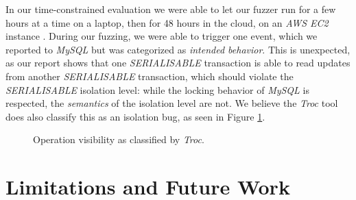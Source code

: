In our time-constrained evaluation we were able to let our fuzzer run for a few hours at a time on a laptop, then for 48 hours in the cloud, on an \textit{AWS EC2} instance \cite{awswebpage}. During our fuzzing, we were able to trigger one event, which we reported to \textit{MySQL} but was categorized as \textit{intended behavior}. This is unexpected, as our report shows that one \textit{SERIALISABLE} transaction is able to read updates from another \textit{SERIALISABLE} transaction, which should violate the \textit{SERIALISABLE} isolation level: while the locking behavior of \textit{MySQL} is respected, the \textit{semantics} of the isolation level are not. We believe the \textit{Troc} tool \cite{dou2023detecting_ICSE2023} does also classify this as an isolation bug, as seen in Figure \ref{fig:trocclassification}.


\begin{figure}[!h]
    \centering
    \caption{Operation visibility as classified by \textit{Troc}.}
    \label{fig:trocclassification}
\end{figure}


\section{Limitations and Future Work}

